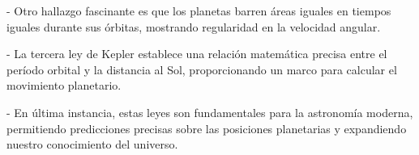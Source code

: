 \documentclass[journal]{IEEEtran}
\begin{document}
- Otro hallazgo fascinante es que los planetas barren áreas iguales en tiempos iguales durante sus órbitas, mostrando regularidad en la velocidad angular.

- La tercera ley de Kepler establece una relación matemática precisa entre el período orbital y la distancia al Sol, proporcionando un marco para calcular el movimiento planetario.

- En última instancia, estas leyes son fundamentales para la astronomía moderna, permitiendo predicciones precisas sobre las posiciones planetarias y expandiendo nuestro conocimiento del universo.




\end{document}
